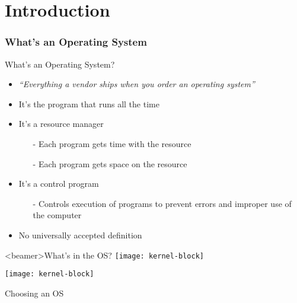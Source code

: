 \mode*
\part{Introduction}


\section{What's an Operating System}

\begin{frame}{What's an Operating System?}
  \begin{itemize}
  \item \emph{``Everything a vendor ships when you order an operating system''}
  \item It's the program that runs all the time
  \item It's a \alert{resource manager}
    \begin{itemize}
    \item[-] Each program gets time with the resource
    \item[-] Each program gets space on the resource
    \end{itemize}
  \item It's a \alert{control program}
    \begin{itemize}
    \item[-] Controls execution of programs to prevent errors and improper use of the
      computer
    \end{itemize}
  \item No universally accepted definition
  \end{itemize}
\end{frame}

\begin{frame}<beamer>{What's in the OS?}
  \centering \texttt{[image: kernel-block]}
\end{frame}

\begin{center}
  \texttt{[image: kernel-block]}
\end{center}

\begin{frame}{Choosing an OS}
  \begin{center}
  \end{center}
\end{frame}

